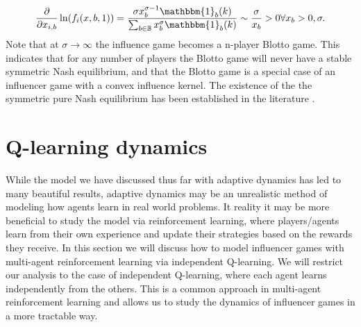 \documentclass{article}
\newcommand {\B}{\mathbb{B}}
\begin{document}
                \begin{equation}
                    \pdv{}{x_{i,b}}\ln(f_i(x,b,1))=\frac{\sigma x^{\sigma-1}_b \mathbbm{1}_{b}(k)}{\sum_{b\in\B}x_{b}^\sigma \mathbbm{1}_{b}(k)}\sim \frac{\sigma}{x_{b}}>0 \forall x_{b}>0, \sigma .
                \end{equation}
                Note that at $\sigma\to \infty$ the influence game becomes a n-player Blotto game. This indicates that for any number of players the Blotto game will never have a stable symmetric Nash equilibrium, and that the Blotto game is a special case of an influencer game with a convex influence kernel. The existence of the the symmetric pure Nash equilibrium has been established in the literature \cite{li2022pure}. 
    \section{Q-learning dynamics}
        While the model we have discussed thus far with adaptive dynamics has led to many beautiful results, adaptive dynamics may be an unrealistic method of modeling how agents learn in real world problems. It reality it may be more beneficial to study the model via reinforcement learning, where players/agents learn from their own experience and update their strategies based on the rewards they receive. In this section we will discuss how to model influencer games with multi-agent reinforcement learning via independent Q-learning. We will restrict our analysis to the case of independent Q-learning, where each agent learns independently from the others. This is a common approach in multi-agent reinforcement learning and allows us to study the dynamics of influencer games in a more tractable way.
\end{document}
